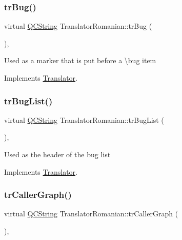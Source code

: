 \subsubsection{\texorpdfstring{trBug()}{trBug()}}
{\footnotesize\ttfamily virtual \mbox{\hyperlink{class_q_c_string}{Q\+C\+String}} Translator\+Romanian\+::tr\+Bug (\begin{DoxyParamCaption}{ }\end{DoxyParamCaption})\hspace{0.3cm}{\ttfamily [inline]}, {\ttfamily [virtual]}}

Used as a marker that is put before a \textbackslash{}bug item 

Implements \mbox{\hyperlink{class_translator}{Translator}}.

\mbox{\label{class_translator_romanian_a68516fcf797836099058b828a5787e25}} 
\subsubsection{\texorpdfstring{trBugList()}{trBugList()}}
{\footnotesize\ttfamily virtual \mbox{\hyperlink{class_q_c_string}{Q\+C\+String}} Translator\+Romanian\+::tr\+Bug\+List (\begin{DoxyParamCaption}{ }\end{DoxyParamCaption})\hspace{0.3cm}{\ttfamily [inline]}, {\ttfamily [virtual]}}

Used as the header of the bug list 

Implements \mbox{\hyperlink{class_translator}{Translator}}.

\mbox{\label{class_translator_romanian_ab64b90d78602f15df0ef350b7b8a3ead}} 
\subsubsection{\texorpdfstring{trCallerGraph()}{trCallerGraph()}}
{\footnotesize\ttfamily virtual \mbox{\hyperlink{class_q_c_string}{Q\+C\+String}} Translator\+Romanian\+::tr\+Caller\+Graph (\begin{DoxyParamCaption}{ }\end{DoxyParamCaption})\hspace{0.3cm}{\ttfamily [inline]}, {\ttfamily [virtual]}}

